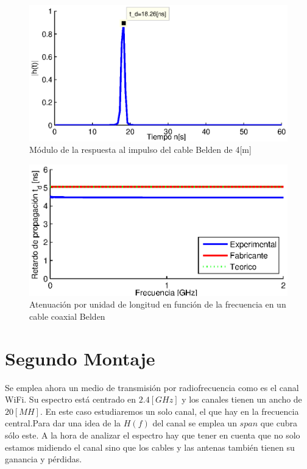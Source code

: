 \documentclass[10pt,conference,a4paper]{IEEEtran}
\begin{document}
\begin{figure}[htb]
    \centering
    \includegraphics[width=\columnwidth]{figuras/respuesta_impulso.eps}
    \caption{Módulo de la respuesta al impulso del cable Belden de 4[m]}
    \label{fig:respuesta_impulso_coaxial}
\end{figure}
\begin{figure}[htb]
    \centering
    \includegraphics[width=\columnwidth]{figuras/retardo.eps}
    \caption{Atenuación por unidad de longitud en función de la frecuencia en un cable coaxial Belden}
    \label{fig:retardo_coaxial}
\end{figure}

\section{Segundo Montaje}

Se emplea ahora un medio de transmisión por radiofrecuencia como es el canal WiFi. Su espectro está centrado en $2.4[GHz]$ y los canales tienen un ancho de $20[MH]$. En este caso estudiaremos un solo canal, el que hay en la frecuencia central.Para dar una idea de la $H(f)$ del canal se emplea un $span$ que cubra sólo este. A la hora de analizar el espectro hay que tener en cuenta que no solo estamos midiendo el canal sino que los cables y las antenas también tienen su ganancia y pérdidas.
 
\end{document}
